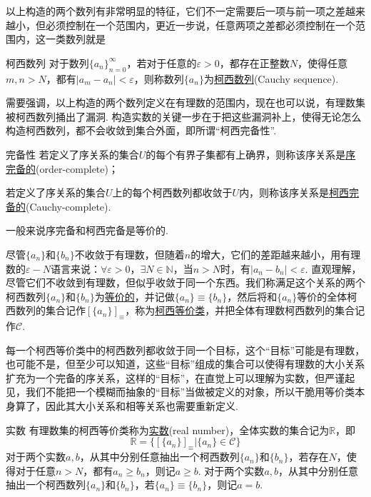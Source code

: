 \documentclass[main.tex]{subfiles}
\begin{document}
以上构造的两个数列有非常明显的特征，它们不一定需要后一项与前一项之差越来越小，但必须控制在一个范围内，更近一步说，任意两项之差都必须控制在一个范围内，这一类数列就是
\begin{definition}{柯西数列}
    对于数列\(\{a_n\}_{n=0}^{\infty}\)，若对于任意的\(\varepsilon>0\)，都存在正整数\(N\)，使得任意\(m,n>N\)，都有\(|a_{m}-a_{n}| < \varepsilon\)，则称数列\(\{a_n\}\)为\uline{柯西数列}(Cauchy sequence).
\end{definition}
需要强调，以上构造的两个数列定义在有理数的范围内，现在也可以说，有理数集被柯西数列捅出了漏洞. 构造实数的关键一步在于把这些漏洞补上，使得无论怎么构造柯西数列，都不会收敛到集合外面，即所谓“柯西完备性”.

\begin{definition}{完备性}
    若定义了序关系的集合\(U\)的每个有界子集都有上确界，则称该序关系是\uline{序完备的}(order-complete)；
    \par
    若定义了序关系的集合\(U\)上的每个柯西数列都收敛于\(U\)内，则称该序关系是\uline{柯西完备的}(Cauchy-complete).
\end{definition}

一般来说序完备和柯西完备是等价的.

尽管\(\{a_n\}\)和\(\{b_n\}\)不收敛于有理数，但随着\(n\)的增大，它们的差距越来越小，用有理数的\(\varepsilon-N\)语言来说：\(\forall \varepsilon > 0\)，\(\exists N\in \mathbb{N}\)，当\(n > N\)时，有\(|a_n-b_n|<\varepsilon\). 直观理解，尽管它们不收敛到有理数，但似乎收敛于同一个东西。我们称满足这个关系的两个柯西数列\(\{a_n\}\)和\(\{b_n\}\)为\uline{等价的}，并记做\(\{a_n\} \equiv \{b_n\}\)，然后将和\(\{a_n\}\)等价的全体柯西数列的集合记作\([\{a_n\}]_{\equiv}\)，称为\uline{柯西等价类}，并把全体有理数柯西数列的集合记作\(\mathcal{C}\).

每一个柯西等价类中的柯西数列都收敛于同一个目标，这个“目标”可能是有理数，也可能不是，但至少可以知道，这些“目标”组成的集合可以使得有理数的大小关系扩充为一个完备的序关系，这样的“目标”，在直觉上可以理解为实数，但严谨起见，我们不能把一个模糊而抽象的“目标”当做被定义的对象，所以干脆用等价类本身算了，因此其大小关系和相等关系也需要重新定义.
\begin{definition}{实数}
    有理数集的柯西等价类称为\uline{实数}(real number)，全体实数的集合记为\(\mathbb{R}\)，即
    \[\mathbb{R} = \{[\{a_n\}]_{\equiv} | \{a_n\}\in \mathcal{C}\}\]
    \newline
    对于两个实数\(a,b\)，从其中分别任意抽出一个柯西数列\(\{a_n\}\)和\(\{b_n\}\)，若存在\(N\)，使得对于任意\(n>N\)，都有\(a_n \geq b_n\)，则记\(a \geq b\).
    \newline
    对于两个实数\(a,b\)，从其中分别任意抽出一个柯西数列\(\{a_n\}\)和\(\{b_n\}\)，若\(\{a_n\} \equiv \{b_n\}\)，则记\(a=b\).
\end{definition}
\end{document}
